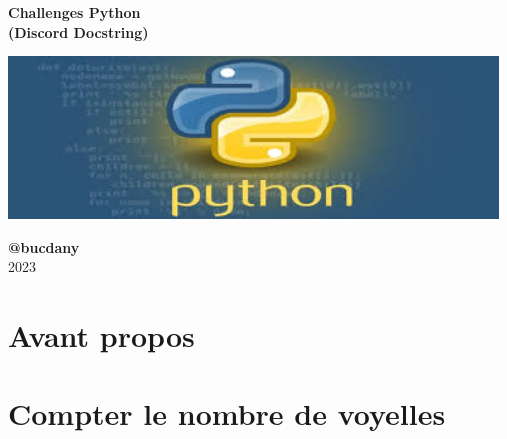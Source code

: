 \documentclass[a4paper,12pt]{book}
\newcommand{\bigger}{\fontsize{80}{100}\selectfont}  %
\begin{document}
\thispagestyle{empty} %
\begin{center}
\begin{tcolorbox}[colback=graylight, boxrule=2pt, sharp corners, toprule=2pt, bottomrule=2pt] %
\begin{minipage}{\textwidth}
    \centering
    \vspace{1.8cm}
    \bigger \textbf{\textcolor{pythonblue}{Challenges Python}} \\
    \vspace{1cm}
    \Large \textbf{\textcolor{pythonyellow}{(Discord \og Docstring\fg{})}}
    
    \vspace{3cm}
    \includegraphics[width=13cm]{IMG/logo_python.jpeg} 
    
    \vspace{6cm}
    
    \Large \textbf{\textcolor{pythonblue}{@bucdany}} \\
    \vspace{2cm}
    2023
    \vspace{1.2cm}
\end{minipage}
\end{tcolorbox}
\end{center}

\clearpage 
\setcounter{page}{1}
\pagestyle{plain}

\tableofcontents

\chapter*{Avant propos}
\lipsum[1-3]

\chapter{Compter le nombre de voyelles}
\vspace{2cm}
\end{document}
